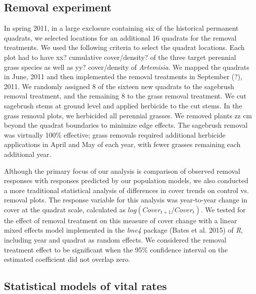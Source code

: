 \documentclass[11pt]{article}
\begin{document}
\begin{doublespacing}
\subsection*{Removal experiment}
In spring 2011, in a large exclosure containing six of the historical permanent quadrats, we selected locations for an additional 16 quadrats for the removal treatments. We used the following criteria to select the quadrat locations. Each plot had to have xx? cumulative cover/density? of the three target perennial grass species as well as yy? cover/density of \textit{Artemisia}. We mapped the quadrats in June, 2011 and then implemented the removal treatments in September (?), 2011. We randomly assigned 8 of the sixteen new quadrats to the sagebrush removal treatment, and the remaining 8 to the grass removal treatment. We cut sagebrush stems at ground level and applied herbicide to the cut stems. In the grass removal plots, we herbicided all perennial grasses. We removed plants zz cm beyond the quadrat boundaries to minimize edge effects. The sagebrush removal was virtually 100\% effective; grass removals required additional herbicide applications in April and May of each year, with fewer grasses remaining each additional year.


Although the primary focus of our analysis is comparison of observed removal responses with responses predicted by our population models, we also conducted a more traditional statistical analysis of differences in cover trends on control vs. removal plots. The response variable for this analysis was year-to-year change in cover at the quadrat scale, calculated as $log(Cover_{t+1}/Cover_t)$. We tested for the effect of removal treatment on this measure of cover change with a linear mixed effects model implemented in the \textit{lme4} package (Bates et al. 2015) of \textit{R}, including year and quadrat as random effects. We considered the removal treatment effect to be significant when the 95\% confidence interval on the estimated coefficient did not overlap zero.

\subsection*{Statistical models of vital rates}


\end{doublespacing}
\end{document}
